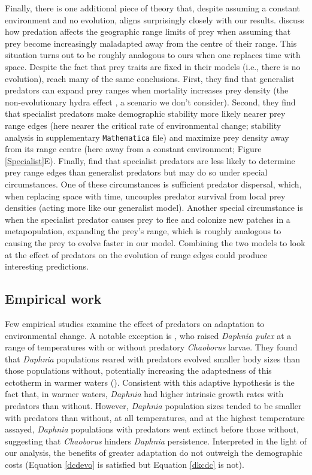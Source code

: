 \documentclass[11pt]{article}
\begin{document}
Finally, there is one additional piece of theory that, despite assuming a constant environment and no evolution, aligns surprisingly closely with our results. 
\cite{Holt2009} discuss how predation affects the geographic range limits of prey when assuming that prey become increasingly maladapted away from the centre of their range.
This situation turns out to be roughly analogous to ours when one replaces time with space.
Despite the fact that prey traits are fixed in their models (i.e., there is no evolution), \cite{Holt2009} reach many of the same conclusions.
First, they find that generalist predators can expand prey ranges when mortality increases prey density (the non-evolutionary hydra effect \citealt{Abrams2009b}, a scenario we don't consider).
Second, they find that specialist predators make demographic stability more likely nearer prey range edges (here nearer the critical rate of environmental change; stability analysis in supplementary \texttt{Mathematica} file) and maximize prey density away from its range centre (here away from a constant environment; Figure \ref{Specialist}E).
Finally, \cite{Holt2009} find that specialist predators are less likely to determine prey range edges than generalist predators but may do so under special circumstances.
One of these circumstances is sufficient predator dispersal, which, when replacing space with time, uncouples predator survival from local prey densities (acting more like our generalist model).
Another special circumstance is when the specialist predator causes prey to flee and colonize new patches in a metapopulation, expanding the prey's range, which is roughly analogous to causing the prey to evolve faster in our model.
Combining the two models to look at the effect of predators on the evolution of range edges could produce interesting predictions.
 
\subsection*{Empirical work}

Few empirical studies examine the effect of predators on adaptation to environmental change. 
A notable exception is \cite{Tseng2015}, who raised \textit{Daphnia pulex} at a range of temperatures with or without predatory \textit{Chaoborus} larvae.
They found that \textit{Daphnia} populations reared with predators evolved smaller body sizes than those populations without, potentially increasing the adaptedness of this ectotherm in warmer waters (\citealt{Atkinson1997}).
Consistent with this adaptive hypothesis is the fact that, in warmer waters, \textit{Daphnia} had higher intrinsic growth rates with predators than without. 
However, \textit{Daphnia} population sizes tended to be smaller with predators than without, at all temperatures, and at the highest temperature assayed, \textit{Daphnia} populations with predators went extinct before those without, suggesting that \textit{Chaoborus} hinders \textit{Daphnia} persistence.
Interpreted in the light of our analysis, the benefits of greater adaptation do not outweigh the demographic costs (Equation \ref{dcdevo} is satisfied but Equation \ref{dkcdc} is not).
\end{document}
